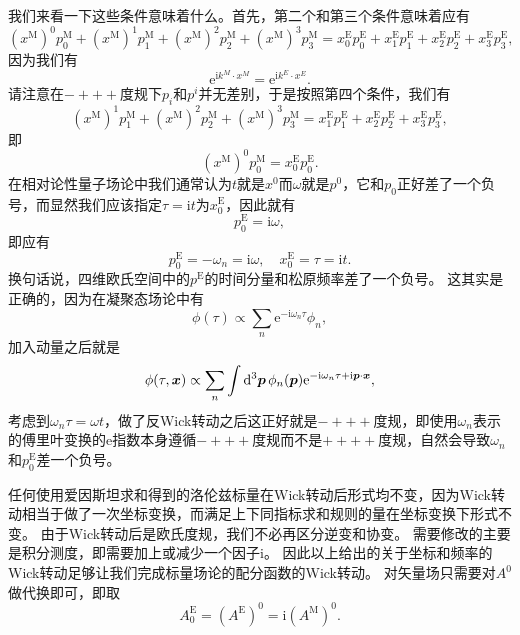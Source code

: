 \documentclass[hyperref, UTF8, a4paper]{ctexart}
\newcommand*{\ii}{\mathrm{i}}
\newcommand*{\ee}{\mathrm{e}}
\begin{document}
我们来看一下这些条件意味着什么。首先，第二个和第三个条件意味着应有
\[
    (x^\text{M})^0 p^\text{M}_0 + (x^\text{M})^1 p^\text{M}_1 + (x^\text{M})^2 p^\text{M}_2 + (x^\text{M})^3 p^\text{M}_3 = x^\text{E}_0 p^\text{E}_0 + x^\text{E}_1 p^\text{E}_1 + x^\text{E}_2 p^\text{E}_2 + x^\text{E}_3 p^\text{E}_3,
\]
因为我们有
\[
    \ee^{\ii k^M \cdot x^M} = \ee^{\ii k^E \cdot x^E}.
\]
请注意在$-+++$度规下$p_i$和$p^i$并无差别，于是按照第四个条件，我们有
\[
    (x^\text{M})^1 p^\text{M}_1 + (x^\text{M})^2 p^\text{M}_2 + (x^\text{M})^3 p^\text{M}_3 = x^\text{E}_1 p^\text{E}_1 + x^\text{E}_2 p^\text{E}_2 + x^\text{E}_3 p^\text{E}_3,
\]
即
\[
    (x^\text{M})^0 p^\text{M}_0 = x^\text{E}_0 p^\text{E}_0.
\]
在相对论性量子场论中我们通常认为$t$就是$x^0$而$\omega$就是$p^0$，它和$p_0$正好差了一个负号，而显然我们应该指定$\tau=\ii t$为$x^\text{E}_0$，因此就有
\[
    p_0^\text{E} = \ii \omega,
\]
即应有
\begin{equation}
    p_0^\text{E} = - \omega_n = \ii \omega, \quad x^\text{E}_0 = \tau = \ii t.
\end{equation}
换句话说，四维欧氏空间中的$p^\text{E}$的时间分量和松原频率差了一个负号。
这其实是正确的，因为在凝聚态场论中有
\[
    \phi(\tau) \propto \sum_n \ee^{-\ii \omega_n \tau} \phi_n,
\]
加入动量之后就是
\[
    \phi(\tau, \vb*{x}) \propto \sum_n \int \dd[3]{\vb*{p}} \phi_n(\vb*{p}) \ee^{-\ii \omega_n \tau + \ii \vb*{p} \cdot \vb*{x}} , 
\]
考虑到$\omega_n \tau = \omega t$，做了反Wick转动之后这正好就是$-+++$度规，即使用$\omega_n$表示的傅里叶变换的$\ee$指数本身遵循$-+++$度规而不是$++++$度规，自然会导致$\omega_n$和$p^\text{E}_0$差一个负号。

任何使用爱因斯坦求和得到的洛伦兹标量在Wick转动后形式均不变，因为Wick转动相当于做了一次坐标变换，而满足上下同指标求和规则的量在坐标变换下形式不变。
由于Wick转动后是欧氏度规，我们不必再区分逆变和协变。
需要修改的主要是积分测度，即需要加上或减少一个因子$\ii$。
因此以上给出的关于坐标和频率的Wick转动足够让我们完成标量场论的配分函数的Wick转动。
对矢量场只需要对$A^0$做代换即可，即取
\begin{equation}
    A^\text{E}_0 = (A^\text{E})^0 = \ii (A^\text{M})^0.
\end{equation}
\end{document}
